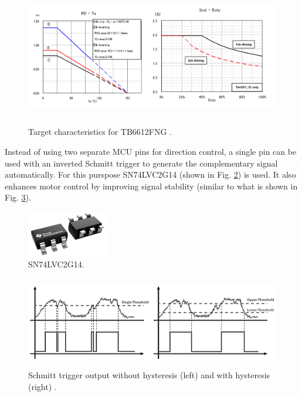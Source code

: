 \documentclass{article}
\begin{document}
\begin{figure}[H]
	\centering
	\includegraphics[height=6cm]{assets/TB6612FNG_target_characteristics}
	\caption{Target characteristics for TB6612FNG \cite{TB6612FNG}.}
	\label{fig:tb6612fng_plot}
\end{figure}

Instead of using two separate MCU pins for direction control, a single pin can be used with an inverted Schmitt trigger to generate the complementary signal automatically. For this purspose SN74LVC2G14 (shown in Fig. \ref{fig:SN74LVC2G14}) is used. It also enhances motor control by improving signal stability (similar to what is shown in Fig. \ref{fig:schmitt_trigger_hysteresis}).  
\begin{figure}[h]
	\centering
	\includegraphics[height=2cm]{assets/SN74LVC2G14.png}
	\caption{SN74LVC2G14\cite{SN74LVC2G14}.}
	\label{fig:SN74LVC2G14}
\end{figure}

\begin{figure}[H]
	\centering
	\includegraphics[height=4cm]{assets/schmitt_trigger_hysteresis.png}
	\caption{Schmitt trigger output without hysteresis (left) and with hysteresis (right) \cite{schmitt_trigger_hysteresis}.}
	\label{fig:schmitt_trigger_hysteresis}
\end{figure}
\end{document}
